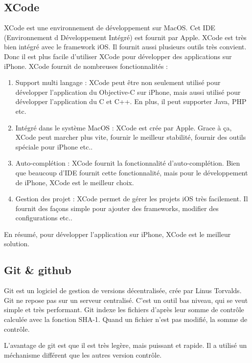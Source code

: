 \subsection{XCode} %
\label{ssub:xcode}

XCode est une environnement de développement sur MacOS. Cet IDE (Environnement d Développement Intégré) est fournit par Apple. XCode est très bien intégré avec le framework iOS. Il fournit aussi plusieurs outils très convient. Donc il est plus facile d'utiliser XCode pour développer des applications sur iPhone. XCode fournit de nombreuses fonctionnalités : 
\begin{enumerate}
	\item Support multi langage : XCode peut être non seulement utilisé pour développer l'application du Objective-C sur iPhone, mais aussi utilisé pour développer l'application du C et C++. En plus, il peut supporter Java, PHP etc. 
	\item Intégré dans le système MacOS : XCode est crée par Apple. Grace à ça, XCode peut marcher plus vite, fournir le meilleur stabilité, fournir des outils spéciale pour iPhone etc..
	\item Auto-complétion : XCode fournit la fonctionnalité d'auto-complétion. Bien que beaucoup d'IDE fournit cette fonctionnalité, mais pour le développement de iPhone, XCode est le meilleur choix. 
	\item Gestion des projet : XCode permet de gérer les projets iOS très facilement. Il fournit des façons simple pour ajouter des frameworks, modifier des configurations etc.. 
\end{enumerate}
En résumé, pour développer l'application sur iPhone, XCode est le meilleur solution.

\subsection{Git & github} %
\label{sub:github}

Git est un logiciel de gestion de versions décentralisée, crée par Linus Torvalds. Git ne repose pas sur un serveur centralisé. C'est un outil bas niveau, qui se veut simple et très performant. Git indexe les fichiers d'après leur somme de contrôle calculée avec la fonction SHA-1. Quand un fichier n'est pas modifié, la somme de contrôle. 

L'avantage de git est que il est très legère, mais puissant et rapide. Il a utilisé un méchanisme différent que les autres version contrôle.

